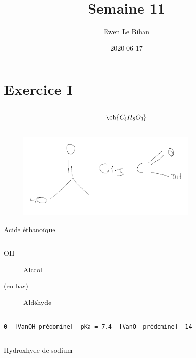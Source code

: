 \documentclass{article}
\title{Semaine 11}
\date{2020-06-17}
\author{Ewen Le Bihan}
\let\ce\ch
\begin{document}
\maketitle

\section{Exercice I}

\subsection{}
\[
	\ce{C_8H_8O_3}
\] 
\subsection{}
\begin{figure}[h]
	\centering
	\includegraphics[width=0.8\textwidth]{./i-2.png}
	\caption{}
	\label{fig:}
\end{figure}
Acide éthanoïque

\subsection{}
\begin{description}
	\item[OH] Alcool
	\item[(en bas)] Aldéhyde
\end{description}

\subsection{}
\texttt{0 --[VanOH prédomine]-- pKa = 7.4 --[VanO- prédomine]-- 14}

\subsection{}
Hydroxhyde de sodium

\subsection{}
\end{document}
